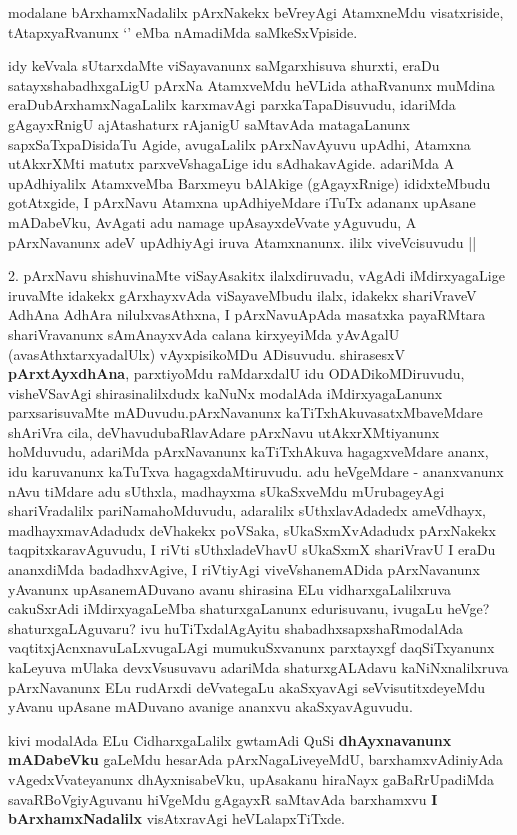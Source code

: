 \begin{center}
\end{center}
\begin{artha}
modalane bArxhamxNadalilx pArxNakekx beVreyAgi AtamxneMdu
visatxriside, tAtapxyaRvanunx `\stext' eMba nAmadiMda
saMkeSxVpiside. 

idy keVvala sUtarxdaMte viSayavanunx saMgarxhisuva shurxti, eraDu
satayxshabadhxgaLigU pArxNa AtamxveMdu heVLida athaRvanunx muMdina
eraDubArxhamxNagaLalilx karxmavAgi parxkaTapaDisuvudu, idariMda
gAgayxRnigU ajAtashaturx rAjanigU saMtavAda matagaLanunx
sapxSaTxpaDisidaTu Agide, avugaLalilx pArxNavAyuvu upAdhi, Atamxna
utAkxrXMti matutx parxveVshagaLige idu sAdhakavAgide. adariMda A
upAdhiyalilx AtamxveMba Barxmeyu bAlAkige (gAgayxRnige) ididxteMbudu
gotAtxgide, I pArxNavu Atamxna upAdhiyeMdare iTuTx adananx upAsane
mADabeVku, AvAgati adu namage upAsayxdeVvate yAguvudu, A pArxNavanunx
adeV upAdhiyAgi iruva Atamxnanunx. ililx viveVcisuvudu ||
\end{artha}


\begin{center}
\end{center}

\begin{artha}
2. pArxNavu shishuvinaMte viSayAsakitx ilalxdiruvadu, vAgAdi
iMdirxyagaLige iruvaMte idakekx gArxhayxvAda viSayaveMbudu ilalx,
idakekx shariVraveV AdhAna  AdhAra nilulxvasAthxna, I pArxNavuApAda
masatxka payaRMtara shariVravanunx sAmAnayxvAda calana kirxyeyiMda
yAvAgalU (avasAthxtarxyadalUlx) vAyxpisikoMDu ADisuvudu. shirasesxV
\textbf{pArxtAyxdhAna}, parxtiyoMdu raMdarxdalU idu ODADikoMDiruvudu,
visheVSavAgi shirasinalilxdudx kaNuNx modalAda iMdirxyagaLanunx
parxsarisuvaMte mADuvudu.pArxNavanunx kaTiTxhAkuvasatxMbaveMdare
shAriVra cila, deVhavudubaRlavAdare pArxNavu utAkxrXMtiyanunx
hoMduvudu, adariMda pArxNavanunx kaTiTxhAkuva hagagxveMdare ananx, idu
karuvanunx kaTuTxva hagagxdaMtiruvudu. adu heVgeMdare - ananxvanunx
nAvu tiMdare adu sUthxla, madhayxma sUkaSxveMdu mUrubageyAgi
shariVradalilx pariNamahoMduvudu, adaralilx sUthxlavAdadedx ameVdhayx,
madhayxmavAdadudx deVhakekx poVSaka, sUkaSxmXvAdadudx pArxNakekx
taqpitxkaravAguvudu, I riVti sUthxladeVhavU  sUkaSxmX shariVravU I
eraDu ananxdiMda badadhxvAgive, I riVtiyAgi viveVshanemADida
pArxNavanunx yAvanunx upAsanemADuvano avanu shirasina ELu
vidharxgaLalilxruva cakuSxrAdi iMdirxyagaLeMba shaturxgaLanunx
edurisuvanu, ivugaLu heVge? shaturxgaLAguvaru? ivu huTiTxdalAgAyitu
shabadhxsapxshaRmodalAda vaqtitxjAcnxnavuLaLxvugaLAgi mumukuSxvanunx
parxtayxgf daqSiTxyanunx kaLeyuva mUlaka devxVsusuvavu adariMda
shaturxgALAdavu kaNiNxnalilxruva pArxNavanunx ELu rudArxdi deVvategaLu
akaSxyavAgi  seVvisutitxdeyeMdu yAvanu upAsane mADuvano avanige
ananxvu akaSxyavAguvudu.

kivi modalAda ELu CidharxgaLalilx gwtamAdi QuSi \textbf{dhAyxnavanunx mADabeVku}
gaLeMdu hesarAda pArxNagaLiveyeMdU, barxhamxvAdiniyAda
vAgedxVvateyanunx dhAyxnisabeVku, upAsakanu hiraNayx gaBaRrUpadiMda
savaRBoVgiyAguvanu hiVgeMdu gAgayxR saMtavAda barxhamxvu \textbf{I bArxhamxNadalilx} 
visAtxravAgi heVLalapxTiTxde.
\end{artha}



